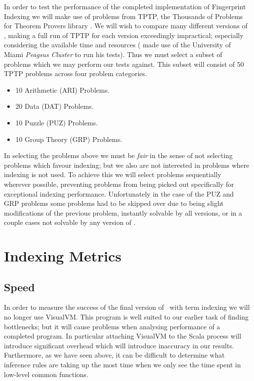 In order to test the performance of the completed implementation of Fingerprint Indexing
we will make use of problems from TPTP, the Thousands of Problems for Theorem Provers
library \cite{tptp}.
We will wish to compare many different versions of \beagle, making a full run of TPTP
for each version
exceedingly impractical; especially considering the available time and resources (
made use of the University of Miami \emph{Peagsus Cluster} to run his tests). Thus
we must select a subset of problems which we may perform our tests against.
This subset will consist of 50 TPTP problems across four problem categories.
\begin{itemize}
\item 10 Arithmetic (ARI) Problems.
\item 20 Data (DAT) Problems.
\item 10 Puzzle (PUZ) Problems.
\item 10 Group Theory (GRP) Problems.
\end{itemize}
In selecting the problems above we must be \emph{fair} in the sense of not selecting
problems which favour indexing; but we also are not interested in problems where
indexing is not used. To achieve this we will select problems sequentially wherever
possible, preventing problems from being picked out specifically for exceptional indexing
performance. Unfortunately in the case of the PUZ and GRP problems some problems had
to be skipped over due to being slight modifications of the previous problem, instantly solvable by all versions,
or in a couple cases not solvable by any version of \beagle.

\section{Indexing Metrics}
\label{sec:metrics}

\subsection{Speed}
In order to measure the success of the final version of \beagle\ with term indexing
we will no longer use VisualVM. This program is well suited to our earlier task
of finding bottlenecks; but it will cause problems when analysing performance of a completed program.
In particular attaching VisualVM to the Scala process will introduce significant overhead
which will introduce inaccuracy in our results. Furthermore, as we have seen above,
it can be difficult to determine what inference rules are taking up the most time
when we only see the time spent in low-level common functions.

